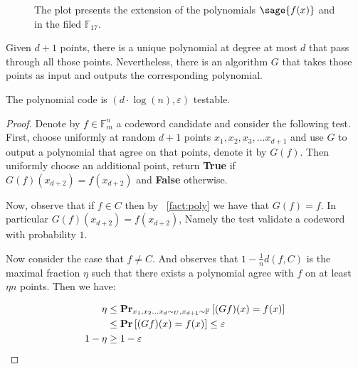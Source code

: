 \begin{figure}[H]
    \caption{The plot presents the extension of the polynomials $\sage{f(x)}$ and  in the filed $\mathbb{F}_{17}$.  }
  \label{fig:polyexample}

\end{figure}

\begin{fact} \label{fact:poly}
  Given $d+1$ points, there is a unique polynomial at degree at most $d$ that pass through all those points. Nevertheless, there is an algorithm $G$ that takes those points as input and outputs the corresponding polynomial.   
\end{fact}

\begin{lemma} The polynomial code is $\left(d \cdot \log\left( n \right), \varepsilon  \right) $ testable.   

\end{lemma}
\begin{proof}
Denote by $f \in \mathbb{F}_{m}^{n}$ a codeword candidate and consider the following test. First, choose uniformly at random $d+1$ points $x_{1}, x_{2}, x_{3}, ... x_{d+1}$ and use $G$ to output a polynomial that agree on that points, denote it by $G\left( f \right)$. Then uniformly choose an additional point, return \textbf{True} if $G\left( f \right)(x_{d+2}) = f\left( x_{d+2} \right)$ and \textbf{False} otherwise.   

  Now, observe that if $f\in C$ then by ~\cref{fact:poly} we have that $G\left( f \right) = f$. In particular $G\left( f \right)(x_{d+2}) = f\left( x_{d+2} \right)$, Namely the test validate a codeword with probability $1$.   

  Now consider the case that $f \neq C$. And observes that $1 - \frac{1}{n} d\left( f, C \right)$ is the maximal fraction $\eta$ such that there exists a polynomial agree with $f$ on at least $\eta n$ points. Then we have:

  \begin{equation*}
    \begin{split}
      \eta & \le \mathbf{Pr}_{x_{1}, x_{2} ... x_{d} \sim_{U}, x_{d+1}\sim \mathbb{F}_{}}\left[ (Gf)(x) = f(x) \right] \\ & \le \mathbf{Pr} \left[ { (Gf)(x) = f(x)} \right] \le \varepsilon \\
       1 - \eta & \ge 1 - \varepsilon 
    \end{split}
  \end{equation*}
\end{proof}

  
